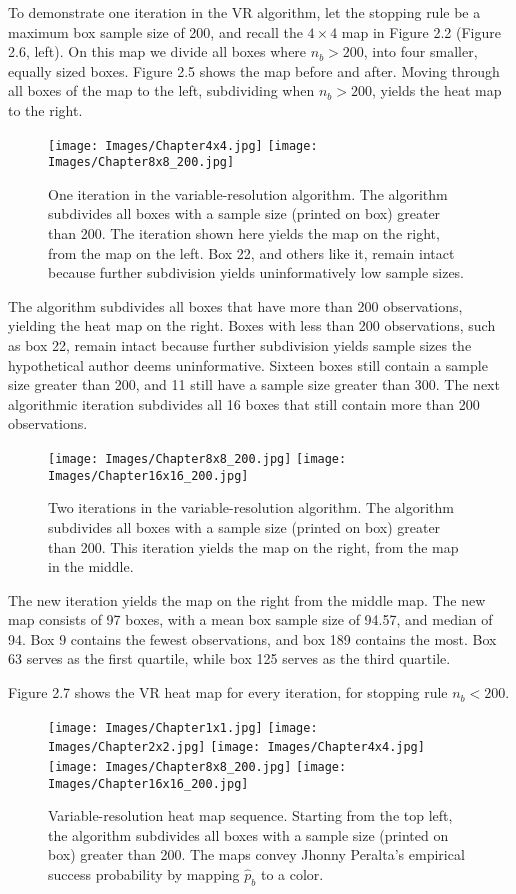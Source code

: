 To demonstrate one iteration in the VR algorithm, let the stopping rule be a maximum box sample size of 200, and recall the $4 \times 4$ map in Figure 2.2 (Figure 2.6, left). On this map we divide all boxes where $n_{b} > 200$, into four smaller, equally sized boxes. Figure 2.5 shows the map before and after. Moving through all boxes of the map to the left, subdividing when $n_{b} > 200$, yields the heat map to the right.
        \begin{figure}[H]
      	\centering
      	\texttt{[image: Images/Chapter4x4.jpg]} 
      	\texttt{[image: Images/Chapter8x8\_200.jpg]} 
      	\caption{One iteration in the variable-resolution algorithm. The algorithm subdivides all boxes with a sample size (printed on box) greater than 200. The iteration shown here yields the map on the right, from the map on the left. Box 22, and others like it, remain intact because further subdivision yields uninformatively low sample sizes.}
      	\end{figure} 
The algorithm subdivides all boxes that have more than 200 observations, yielding the heat map on the right. Boxes with less than 200 observations, such as box 22, remain intact because further subdivision yields sample sizes the hypothetical author deems uninformative. Sixteen boxes still contain a sample size greater than 200, and 11 still have a sample size greater than 300. The next algorithmic iteration subdivides all 16 boxes that still contain more than 200 observations. 
        \begin{figure}[H]
      	\centering
      	\texttt{[image: Images/Chapter8x8\_200.jpg]} 
      	\texttt{[image: Images/Chapter16x16\_200.jpg]} 
      	\caption{Two iterations in the variable-resolution algorithm. The algorithm subdivides all boxes with a sample size (printed on box) greater than 200. This iteration yields the map on the right, from the map in the middle.}
      	\end{figure}
The new iteration yields the map on the right from the middle map. The new map consists of 97 boxes, with a mean box sample size of 94.57, and median of 94. Box 9 contains the fewest observations, and box 189 contains the most. Box 63 serves as the first quartile, while box 125 serves as the third quartile. 

Figure 2.7 shows the VR heat map for every iteration, for stopping rule $n_{b} < 200$.
        \begin{figure}[H]
      	\centering
      	\texttt{[image: Images/Chapter1x1.jpg]}
      	\texttt{[image: Images/Chapter2x2.jpg]}
      	\texttt{[image: Images/Chapter4x4.jpg]}
      	\texttt{[image: Images/Chapter8x8\_200.jpg]} 
      	\texttt{[image: Images/Chapter16x16\_200.jpg]} 
      	\caption{Variable-resolution heat map sequence. Starting from the top left, the algorithm subdivides all boxes with a sample size (printed on box) greater than 200. The maps convey Jhonny Peralta's empirical success probability by mapping $\hat{p}_{b}$ to a color.}
      	\end{figure}
      	
